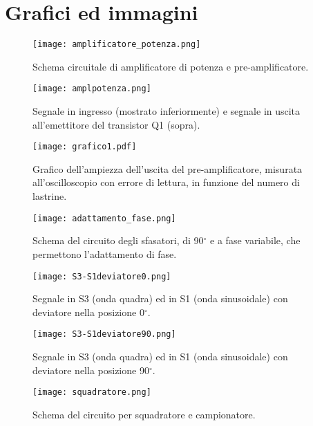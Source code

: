 \section{Grafici ed immagini}

\begin{figure}[h]
	\centering
	\texttt{[image: amplificatore\_potenza.png]}
	\caption{Schema circuitale di amplificatore di potenza e pre-amplificatore.}
	\label{f:pre-amp}
\end{figure}

\begin{figure}[h]
	\centering
	\texttt{[image: amplpotenza.png]}
	\caption{Segnale in ingresso (mostrato inferiormente) e segnale in uscita all'emettitore del transistor Q1 (sopra).}
	\label{f:amplpotenza}
\end{figure}

\begin{figure}[h]
	\centering
	\texttt{[image: grafico1.pdf]}
	\caption{Grafico dell'ampiezza dell'uscita del pre-amplificatore, misurata all'oscilloscopio con errore di lettura, in funzione del numero di lastrine.}
	\label{f:Grafico1}
\end{figure}

\begin{figure}[h]
	\centering
	\texttt{[image: adattamento\_fase.png]}
	\caption{Schema del circuito degli sfasatori, di 90$^\circ$ e a fase variabile, che permettono l'adattamento di fase.}
	\label{f:adattamento_fase}
\end{figure}

\begin{figure}[h]
	\centering
	\texttt{[image: S3-S1deviatore0.png]}
	\caption{Segnale in S3 (onda quadra) ed in S1 (onda sinusoidale) con deviatore nella posizione 0$^\circ$.}
	\label{f:S3-S1deviatore0}
\end{figure}

\begin{figure}[h]
	\centering
	\texttt{[image: S3-S1deviatore90.png]}
	\caption{Segnale in S3 (onda quadra) ed in S1 (onda sinusoidale) con deviatore nella posizione 90$^\circ$.}
	\label{f:S3-S1deviatore90}
\end{figure}

\begin{figure}[h]
	\centering
	\texttt{[image: squadratore.png]}
	\caption{Schema del circuito per squadratore e campionatore.}
	\label{f:squadratore}
\end{figure}

